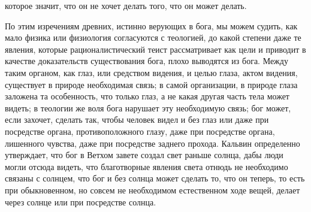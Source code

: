 \documentclass[12pt]{article}
\begin{document}
которое значит, что он не хочет делать того, что он может делать. 

По этим изречениям древних, истинно верующих в бога, мы можем судить, как мало физика или физиология согласуются с теологией, до какой степени даже те явления, которые рационалистический теист рассматривает как цели и приводит в качестве доказательств существования бога, плохо выводятся из бога. Между таким органом, как глаз, или средством видения, и целью глаза, актом видения, существует в природе необходимая связь; в самой организации, в природе глаза заложена та особенность, что только глаз, а не какая другая часть тела может видеть; в теологии же воля бога нарушает эту необходимую связь; бог может, если захочет, сделать так, чтобы человек видел и без глаз или даже при посредстве органа, противоположного глазу, даже при посредстве органа, лишенного чувства, даже при посредстве заднего прохода. Кальвин определенно утверждает, что бог в Ветхом завете создал свет раньше солнца, дабы люди могли отсюда видеть, что благотворные явления света отнюдь не необходимо связаны с солнцем, что бог и без солнца может сделать то, что он теперь, то есть при обыкновенном, но совсем не необходимом естественном ходе вещей, делает через солнце или при посредстве солнца. 
\end{document}

